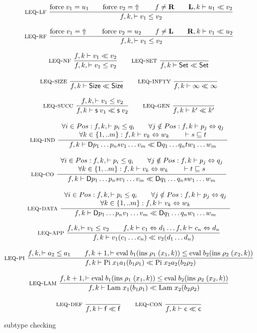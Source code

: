 \begin{figure}[p]
\begin{gather*}
\mbox{\sc leq-lf}\ \dfrac{\mathrm{force} \; v_1 = u_1 \qquad \mathrm{force} \; v_2 = \;\Uparrow 
\qquad
f \neq \mathbf{R} \qquad \mathbf{L},k\vdash u_1{\;\ll\;}v_2}{ f,k,\vdash v_1\leq v_2}
\\[2ex]
\mbox{\sc leq-rf}\ \dfrac{\mathrm{force} \; v_1 = \;\Uparrow \qquad \mathrm{force} \; v_2 = u_2 
\qquad
f \neq \mathbf{L} \qquad \mathbf{R},k\vdash v_1{\;\ll\;}u_2}{ f,k,\vdash v_1\leq v_2}
\\[2ex]
\mbox{\sc leq-nf}\ \dfrac{f,k\vdash v_1{\;\ll\;}v_2}{ f,k,\vdash v_1\leq v_2}
\qquad
\mbox{\sc leq-set}\ \dfrac{}{f,k\vdash\mathsf{Set}{\;\ll\;}\mathsf{Set}}
\\[2ex]
\mbox{\sc leq-size}\ \dfrac{}{f,k\vdash\mathsf{Size}{\;\ll\;}\mathsf{Size}}
\qquad
\mbox{\sc leq-infty}\ \dfrac{}{f,k\vdash\infty{\;\ll\;}\infty}
\\[2ex]
\mbox{\sc leq-succ}\ \dfrac{f,k,\vdash v_1\leq v_2}{f,k\vdash\mathsf{s}\; v_1{\;\ll\;}\mathsf{s}\; v_2}
\qquad
\mbox{\sc leq-gen}\ \dfrac{}{f,k\vdash k'{\;\ll\;}k'}
\\[2ex]
\mbox{\sc leq-ind}\ \dfrac{\begin{array}[b]{c}\forall i \in Pos: f,k,\vdash p_i\leq q_i 
\qquad
\forall j \notin Pos : f,k\vdash p_j\Leftrightarrow q_j 
\\\forall k \in \{1,..m\}:f,k\vdash v_k\Leftrightarrow w_k
\qquad
\vdash s\sqsubseteq t \end{array}}{f,k\vdash\mathsf{D} p_1 \ldots p_n s v_1 \ldots v_m{\;\ll\;}\mathsf{D} q_1 \ldots q_n t w_1 \ldots w_m}
\\[2ex]
\mbox{\sc leq-co}\ \dfrac{\begin{array}[b]{c}\forall i \in Pos: f,k,\vdash p_i\leq q_i 
\qquad
\forall j \notin Pos : f,k\vdash p_j\Leftrightarrow q_j\\\forall k \in \{1,..m\}:f,k\vdash v_k\Leftrightarrow w_k
\qquad
\vdash t\sqsubseteq s \end{array}}{f,k\vdash\mathsf{D} p_1 \ldots p_n s v_1 \ldots v_m{\;\ll\;}\mathsf{D} q_1 \ldots q_n s w_1 \ldots w_m}
\\[2ex]
\mbox{\sc leq-data}\ \dfrac{\begin{array}[b]{c}\forall i \in Pos: f,k,\vdash p_i\leq q_i 
\qquad
\forall j \notin Pos : f,k\vdash p_j\Leftrightarrow q_j\\\forall k \in \{1,..m\}:f,k\vdash v_k\Leftrightarrow w_k\end{array}}{f,k\vdash\mathsf{D} p_1 \ldots p_n v_1 \ldots v_m{\;\ll\;}\mathsf{D} q_1 \ldots q_n w_1 \ldots w_m}
\\[2ex]
\mbox{\sc leq-app}\ \dfrac{f,k,\vdash v_1\leq v_2 \qquad
f,k\vdash c_1\Leftrightarrow d_1 \ldots f,k\vdash c_n\Leftrightarrow d_n}{f,k\vdash v_1 (c_1 \ldots c_n){\;\ll\;}v_2 (d_1 \ldots d_n)}
\\[2ex]
\mbox{\sc leq-pi}\ \dfrac{f,k,\vdash a_2\leq a_1
\qquad
f,k+1,\vdash\mathrm{eval} \; b_1 (\mathrm{ins} \; \rho_1 \; (x_1,k))\leq\mathrm{eval} \; b_2 (\mathrm{ins} \; \rho_2 \; (x_2,k))}{f,k\vdash\mathrm{Pi} \; x_1 a_1 (b_1 \rho_1){\;\ll\;}\mathrm{Pi} \; x_2 a_2 (b_2 \rho_2)}
\\[2ex]
\mbox{\sc leq-lam}\ \dfrac{f,k+1,\vdash\mathrm{eval} \; b_1 (\mathrm{ins} \; \rho_1 \; (x_1,k))\leq\mathrm{eval} \; b_2 (\mathrm{ins} \; \rho_2 \; (x_2,k))}{f,k\vdash\mathrm{Lam} \; x_1 (b_1 \rho_1){\;\ll\;}\mathrm{Lam} \; x_2 (b_2 \rho_2)}
\\[2ex]
\mbox{\sc leq-def}\ \dfrac{}{f,k\vdash\mathsf{f}{\;\ll\;}\mathsf{f}}
\qquad
\mbox{\sc leq-con}\ \dfrac{}{f,k\vdash\mathsf{c}{\;\ll\;}\mathsf{c}}
\end{gather*}
\caption{subtype checking}
\end{figure}

